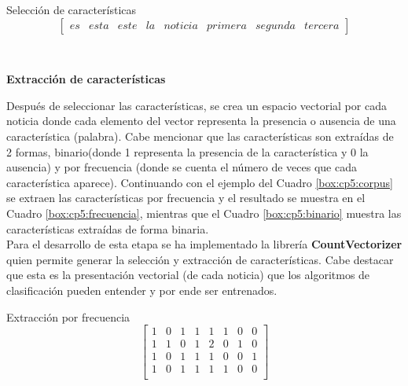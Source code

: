 \begin{mygraybox}[label={box:cp5:caracteristicas}]{Selección de características} 
\begin{equation*}
\begin{bmatrix}
es & esta & este & la & noticia & primera & segunda & tercera
\end{bmatrix}
\end{equation*}
\end{mygraybox}


\ \\

\begin{large}
\textbf{Extracción de características}\\
\end{large}

Después de seleccionar las características, se crea un espacio vectorial por cada noticia donde cada elemento del vector representa la presencia o ausencia de una característica (palabra). Cabe mencionar que las características son extraídas de 2 formas, binario(donde 1 representa la presencia de la característica y 0 la ausencia) y por frecuencia (donde se cuenta el número de veces que cada característica aparece). Continuando con el ejemplo del Cuadro \ref{box:cp5:corpus} se extraen las características por frecuencia y el resultado se muestra en el Cuadro \ref{box:cp5:frecuencia}, mientras que el Cuadro \ref{box:cp5:binario} muestra las características extraídas de forma binaria.\\

Para el desarrollo de esta etapa se ha implementado la librería \textbf{CountVectorizer} quien permite generar la selección y extracción de características. Cabe destacar que esta es la presentación vectorial (de cada noticia) que los algoritmos de clasificación pueden entender y por ende ser entrenados.\\

\begin{mygraybox}[label={box:cp5:frecuencia}]{Extracción por frecuencia} 
\begin{equation*}
\begin{bmatrix}
1 & 0 & 1 & 1 & 1 & 1 & 0 & 0\\ 
1 & 1 & 0 & 1 & 2 & 0 & 1 & 0\\
1 & 0 & 1 & 1 & 1 & 0 & 0 & 1\\
1 & 0 & 1 & 1 & 1 & 1 & 0 & 0\\
\end{bmatrix}
\end{equation*}
\end{mygraybox}

